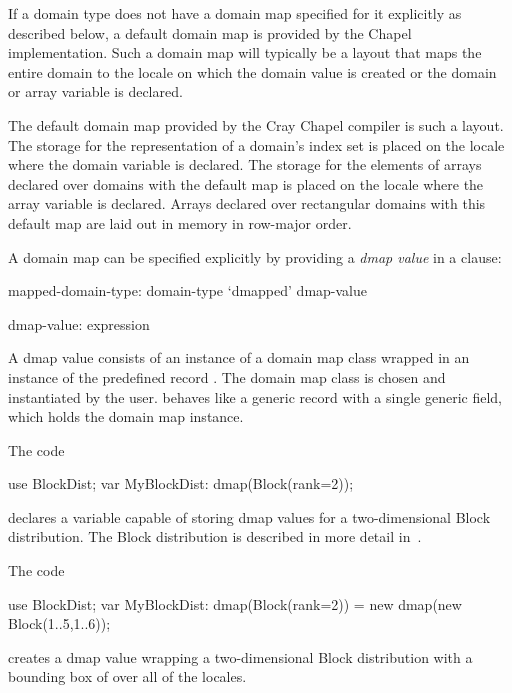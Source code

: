 If a domain type does not have a domain map specified for it
explicitly as described below,
a default domain map is provided by the Chapel implementation.
Such a domain map will typically be a layout that maps the entire domain
to the locale on which the domain value is created or
the domain or array variable is declared.

\begin{craychapel}
The default domain map provided by the Cray Chapel compiler
is such a layout. The storage for the representation of a domain's
index set is placed on the locale where the domain variable is declared.
The storage for the elements of arrays declared over domains with
the default map is placed on the locale where the array variable
is declared.
Arrays declared over rectangular domains with this default map
are laid out in memory in row-major order.
\end{craychapel}

A domain map can be specified explicitly by
providing a \emph{dmap value} in a  clause:

\begin{syntax}
mapped-domain-type:
  domain-type `dmapped' dmap-value

dmap-value:
  expression
\end{syntax}

A dmap value consists of an instance of a domain map class
wrapped in an instance of the predefined record .
The domain map class is chosen and instantiated by the user.
 behaves like a generic record with a single generic field,
which holds the domain map instance.

\begin{example}
The code
\begin{chapel}
use BlockDist;
var MyBlockDist: dmap(Block(rank=2));
\end{chapel}
declares a variable capable of storing dmap values
for a two-dimensional Block distribution.
The Block distribution is described in more
detail in~.
\end{example}

\begin{example}
The code
\begin{chapel}
use BlockDist;
var MyBlockDist: dmap(Block(rank=2)) = new dmap(new Block({1..5,1..6}));
\end{chapel}
creates a dmap value wrapping a two-dimensional Block distribution with a
bounding box of  over all of the locales.
\end{example}

